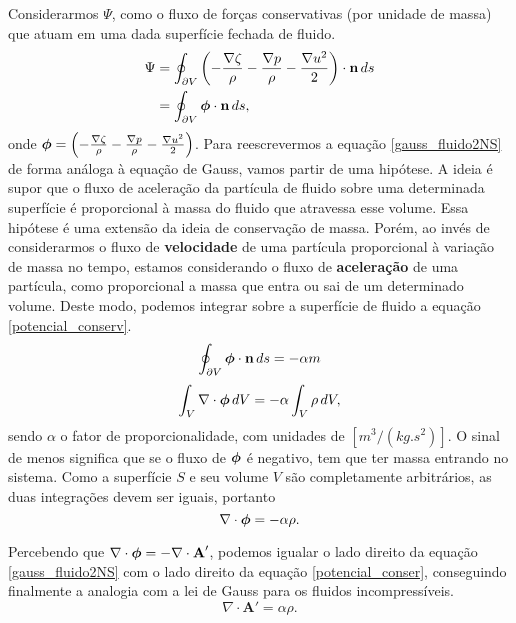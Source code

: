 Considerarmos $\Psi$, como o fluxo de forças conservativas (por unidade de massa) que atuam em uma dada superfície fechada de fluido.
\begin{align*}
    \Psi & = \oint_{\partial V} \left(-\frac{\nabla \zeta}{\rho} - \frac{\nabla p}{\rho} - \frac{\nabla u^2}{2}\right)\cdot \textbf{n} \,ds
    \\
    & = \oint_{\partial V} \text{\boldmath$\phi$}\cdot \textbf{n} \,ds,
\end{align*}
onde $\text{\boldmath$\phi$} = \left(-\frac{\nabla \zeta}{\rho} - \frac{\nabla p}{\rho} - \frac{\nabla u^2}{2}\right)$. Para reescrevermos a equação \ref{gauss_fluido2NS} de forma análoga à equação de Gauss, vamos partir de uma hipótese. A ideia é supor que o fluxo de aceleração da partícula de fluido sobre uma determinada superfície é proporcional à massa do fluido que atravessa esse volume. Essa hipótese é uma extensão da ideia de conservação de massa. Porém, ao invés de considerarmos o fluxo de \textbf{velocidade} de uma partícula proporcional à variação de massa no tempo, estamos considerando o fluxo de \textbf{aceleração} de uma partícula, como proporcional a massa que entra ou sai de um determinado volume. Deste modo, podemos integrar sobre a superfície de fluido a equação \ref{potencial_conserv}.
\begin{equation*}
    \oint_{\partial V} \text{\boldmath$\phi$}\cdot \textbf{n} \,ds = -\alpha m
\end{equation*}
\begin{equation*}
    \int_{V} \nabla\cdot\text{\boldmath$\phi$} \,dV = -\alpha\int_{V} \rho \,dV,
\end{equation*}
sendo $\alpha$ o fator de proporcionalidade, com unidades de $[m^3/(kg.s^2)]$. O sinal de menos significa que se o fluxo de $\text{\boldmath$\phi$}$ é negativo, tem que ter massa entrando no sistema. Como a superfície $S$ e seu volume $V$ são completamente arbitrários, as duas integrações devem ser iguais, portanto
\begin{equation}\label{potencial_conser}
   \nabla\cdot\text{\boldmath$\phi$} =- \alpha\rho.
\end{equation}

Percebendo que $\nabla\cdot\text{\boldmath$\phi$} = - \nabla\cdot\textbf{A}'$, podemos igualar o lado direito da equação \ref{gauss_fluido2NS} com o lado direito da equação \ref{potencial_conser}, conseguindo finalmente a analogia com a lei de Gauss para os fluidos incompressíveis.
\begin{equation*}\label{gauss_fluido3NS}
    \nabla \cdot \textbf{A}' = \alpha\rho.
\end{equation*}

